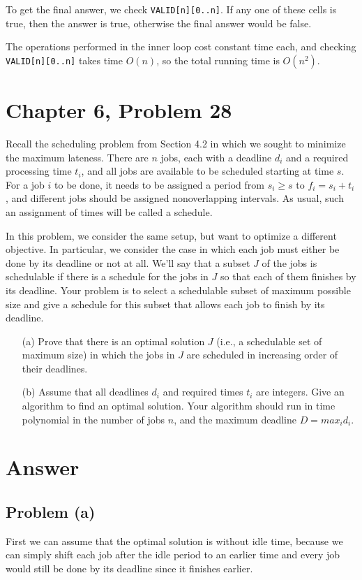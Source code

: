 \documentclass[12pt,letterpaper]{article}
\begin{document}
To get the final answer, we check \texttt{VALID[n][0..n]}. If any one of these cells is true, then the answer is true, otherwise the final answer would be false.

The operations performed in the inner loop cost constant time each, and checking \texttt{VALID[n][0..n]} takes time $O(n)$, so the total running time is $O(n^2)$.

\section*{Chapter 6, Problem 28}
Recall the scheduling problem from Section 4.2 in which we sought to
minimize the maximum lateness. There are $n$ jobs, each with a deadline
$d_i$ and a required processing time $t_i$, and all jobs are available to be
scheduled starting at time $s$. For a job $i$ to be done, it needs to be assigned
a period from $s_i \ge s$ to $f_i = s_i + t_i$, and different jobs should be assigned
nonoverlapping intervals. As usual, such an assignment of times will be
called a schedule.

In this problem, we consider the same setup, but want to optimize a
different objective. In particular, we consider the case in which each job
must either be done by its deadline or not at all. We'll say that a subset $J$ of
the jobs is schedulable if there is a schedule for the jobs in $J$ so that each
of them finishes by its deadline. Your problem is to select a schedulable
subset of maximum possible size and give a schedule for this subset that
allows each job to finish by its deadline.
\begin{itemize}
\item[(a)] Prove that there is an optimal solution $J$ (i.e., a schedulable set of
maximum size) in which the jobs in $J$ are scheduled in increasing
order of their deadlines.
\item[(b)] Assume that all deadlines $d_i$ and required times $t_i$ are integers. Give
an algorithm to find an optimal solution. Your algorithm should
run in time polynomial in the number of jobs $n$, and the maximum
deadline $D = max_id_i$.
\end{itemize}

\section*{Answer}

\subsection*{Problem (a)}
First we can assume that the optimal solution is without idle time, because we can simply shift each job after the idle period to an earlier time and every job would still be done by its deadline since it finishes earlier. 
\end{document}
